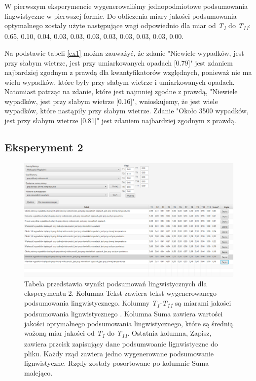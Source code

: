 \documentclass{classrep}
\begin{document}
W pierwszym eksperymencie wygenerowaliśmy jednopodmiotowe podsumowania lingwistyczne w pierwszej formie. Do obliczenia miary jakości podsumowania optymalnego zostały użyte następujące wagi odpowiednio dla miar od \textit{T\textsubscript{1}} do \textit{T\textsubscript{11}}: 0.65, 0.10, 0.04, 0.03, 0.03, 0.03, 0.03, 0.03, 0.03, 0.03, 0.00.

Na podstawie tabeli \ref{ex1} można zauważyć, że zdanie "Niewiele wypadków, jest przy słabym wietrze, jest przy umiarkowanych opadach [0.79]" jest zdaniem najbardziej zgodnym z prawdą dla kwantyfikatorów względnych, ponieważ nie ma wielu wypadków, które były przy słabym wietrze i umiarkowanych opadach. Natomiast patrząc na zdanie, które jest najmniej zgodne z prawdą, "Niewiele wypadków, jest przy słabym wietrze [0.16]", wnioskujemy, że jest wiele wypadków, które nastąpiły przy słabym wietrze. Zdanie "Około 3500 wypadków, jest przy słabym wietrze [0.81]" jest zdaniem najbardziej zgodnym z prawdą.


\newpage
\subsection{Eksperyment 2}
\label{section:ex2}
\begin{figure}[h!]
\centering
\includegraphics[width=15cm]{ex2.png}
\vspace{-0.3cm}
\caption{Tabela przedstawia wyniki podsumowań lingwistycznych dla eksperymentu 2. Kolumna Tekst zawiera tekst wygenerowanego podsumowania lingwistycznego. Kolumny \textit{T\textsubscript{1}}-\textit{T\textsubscript{11}} są miarami jakości podsumowania lignwistycznego \cite{niewiadomski19}. Kolumna Suma zawiera wartości jakości optymalnego podsumowania lingwistycznego, które są średnią ważoną miar jakości od \textit{T\textsubscript{1}} do \textit{T\textsubscript{11}}. Ostatnia kolumna, Zapisz, zawiera przcisk zapisujący dane podsumwoanie lignwistyczne do pliku. Każdy rząd zawiera jedno wygenerowane podsumowanie lignwistyczne. Rzędy zostały posortowane po kolumnie Suma malejąco. }
\label{ex2}
\end{figure}
\end{document}
